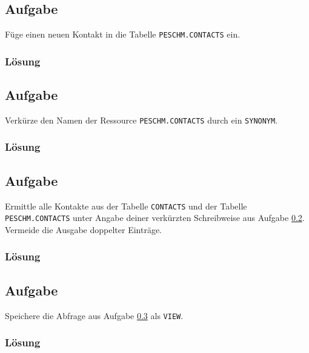\subsection{Aufgabe}
\label{sec:uebung_03.aufgabe_03}
Füge einen neuen Kontakt in die Tabelle \texttt{PESCHM.CONTACTS} ein.

\subsubsection*{Lösung}
\label{sec:uebung_03.aufgabe_03.loesung}

\subsection{Aufgabe}
\label{sec:uebung_03.aufgabe_04}
Verkürze den Namen der Ressource \texttt{PESCHM.CONTACTS} durch ein \texttt{SYNONYM}.

\subsubsection*{Lösung}
\label{sec:uebung_03.aufgabe_04.loesung}

\subsection{Aufgabe}
\label{sec:uebung_03.aufgabe_05}
Ermittle alle Kontakte aus der Tabelle \texttt{CONTACTS} und der Tabelle \texttt{PESCHM.CONTACTS} unter Angabe deiner verkürzten Schreibweise aus Aufgabe \ref{sec:uebung_03.aufgabe_04}. Vermeide die Ausgabe doppelter Einträge.

\subsubsection*{Lösung}
\label{sec:uebung_03.aufgabe_05.loesung}

\subsection{Aufgabe}
\label{sec:uebung_03.aufgabe_06}
Speichere die Abfrage aus Aufgabe \ref{sec:uebung_03.aufgabe_05} als \texttt{VIEW}.

\subsubsection*{Lösung}
\label{sec:uebung_03.aufgabe_06.loesung}
